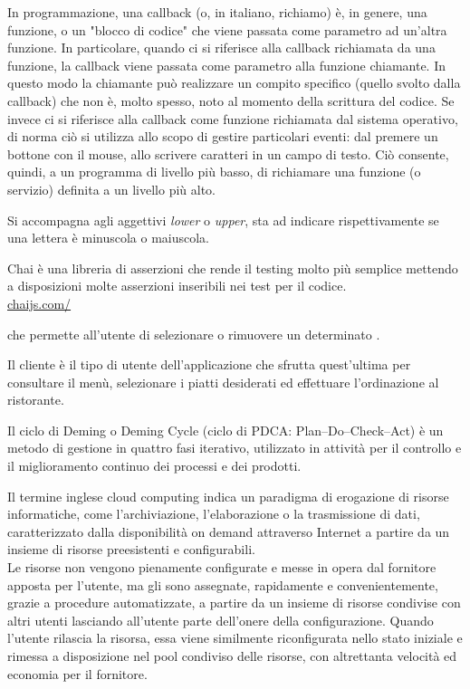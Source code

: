 In programmazione, una callback (o, in italiano, richiamo) è, in genere, una funzione, o un "blocco di codice" che viene passata come parametro ad un'altra funzione. 
In particolare, quando ci si riferisce alla callback richiamata da una funzione, la callback viene passata come parametro alla funzione chiamante. In questo modo la chiamante può realizzare un compito specifico (quello svolto dalla callback) che non è, molto spesso, noto al momento della scrittura del codice. Se invece ci si riferisce alla callback come funzione richiamata dal sistema operativo, di norma ciò si utilizza allo scopo di gestire particolari eventi: dal premere un bottone con il mouse, allo scrivere caratteri in un campo di testo. Ciò consente, quindi, a un programma di livello più basso, di richiamare una funzione (o servizio) definita a un livello più alto.

Si accompagna agli aggettivi \textit{lower} o \textit{upper}, sta ad indicare rispettivamente se una lettera è minuscola o maiuscola.


Chai è una libreria  di asserzioni che rende il testing molto più semplice mettendo a disposizioni molte asserzioni inseribili nei test per il codice.\\
\url{chaijs.com/}

 che permette all’utente di selezionare o rimuovere un determinato .

Il cliente è il tipo di utente dell’applicazione che sfrutta quest’ultima per consultare il menù, selezionare i piatti desiderati ed effettuare l’ordinazione al ristorante.

Il ciclo di Deming o Deming Cycle (ciclo di PDCA: Plan–Do–Check–Act) è un metodo di gestione in quattro fasi iterativo, utilizzato in attività per il controllo e il miglioramento continuo dei processi e dei prodotti.

Il termine inglese cloud computing indica un paradigma di erogazione di risorse informatiche, come l'archiviazione, l'elaborazione o la trasmissione di dati, caratterizzato dalla disponibilità on demand attraverso Internet a partire da un insieme di risorse preesistenti e configurabili.\\
Le risorse non vengono pienamente configurate e messe in opera dal fornitore apposta per l'utente, ma gli sono assegnate, rapidamente e convenientemente, grazie a procedure automatizzate, a partire da un insieme di risorse condivise con altri utenti lasciando all'utente parte dell'onere della configurazione. Quando l'utente rilascia la risorsa, essa viene similmente riconfigurata nello stato iniziale e rimessa a disposizione nel pool condiviso delle risorse, con altrettanta velocità ed economia per il fornitore.

